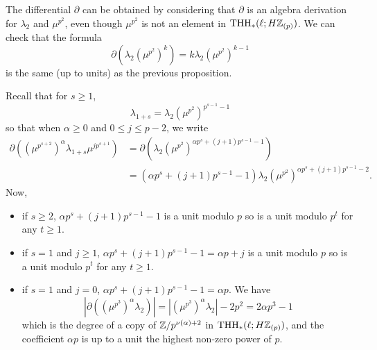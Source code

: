\begin{remark}
  The differential $\partial$ can be obtained by considering that $\partial$ is an algebra derivation for $\lambda_2$ and $\mu^{p^2}$, even though $\mu^{p^2}$ is not an element in $\operatorname{THH}_*(\ell; H \mathbb{Z}_{(p)})$. We can check that the formula
  \begin{equation}
    \partial(\lambda_{2} (\mu^{p^2})^k) = k \lambda_2 (\mu^{p^2})^{k-1}
  \end{equation}
  is the same (up to units) as the previous proposition.

  Recall that for $s \geq 1$,
  \begin{equation}
    \lambda_{1+s} = \lambda_2 (\mu^{p^2})^{p^{s-1} - 1}
  \end{equation}
  so that when $\alpha \geq 0$ and $0 \leq j \leq p-2$, we write
  \begin{equation}
    \begin{aligned}
      \partial\left((\mu^{p^{s+2}})^\alpha \lambda_{1+s} \mu^{j p^{s+1}}\right)
      & = \partial\left(\lambda_2 (\mu^{p^2})^{\alpha p^s + (j+1)p^{s-1} - 1}\right) \\
      & = (\alpha p^s + (j+1) p^{s-1} - 1) \lambda_2 (\mu^{p^2})^{\alpha p^s + (j+1)p^{s-1} - 2}.
    \end{aligned}
  \end{equation}
  Now,
  \begin{itemize}
  \item if $s \geq 2$, $\alpha p^s + (j+1) p^{s-1} - 1$ is a unit modulo $p$ so is a unit modulo $p^t$ for any $t \geq 1$.
  \item if $s = 1$ and $j \geq 1$, $\alpha p^s + (j+1) p^{s-1} - 1 = \alpha p + j$ is a unit modulo $p$ so is a unit modulo $p^t$ for any $t \geq 1$.
  \item if $s = 1$ and $j = 0$, $\alpha p^s + (j+1) p^{s-1} - 1 = \alpha p$. We have
    \begin{equation}
      \left| \partial\left((\mu^{p^3})^\alpha \lambda_2\right) \right| = \left| (\mu^{p^3})^\alpha \lambda_2 \right| - 2p^2 = 2 \alpha p^3 - 1
    \end{equation}
    which is the degree of a copy of $\mathbb{Z} / p^{\nu(\alpha) +2}$ in $\operatorname{THH}_*(\ell; H\mathbb{Z}_{(p)})$, and the coefficient $\alpha p$ is up to a unit the highest non-zero power of $p$.
  \end{itemize}
\end{remark}

